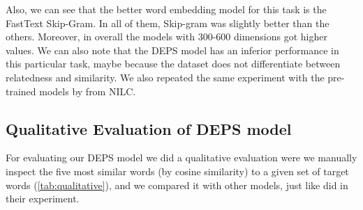 Also, we can see that the better word embedding model for this task is the FastText Skip-Gram. In all of them, Skip-gram was slightly better than the others. Moreover, in overall the models with 300-600 dimensions got higher values. We can also note that the DEPS model has an inferior performance in this particular task, maybe because the dataset does not differentiate between relatedness and similarity.
We also repeated the same experiment with the pre-trained models by  from NILC.


\subsection{Qualitative Evaluation of DEPS model}\label{chap:results:qualitative}

For evaluating our DEPS model we did a qualitative evaluation were we manually inspect the five most similar words (by cosine similarity) to a given set of target words (\autoref{tab:qualitative}), and we compared it with other models, just like  did in their experiment.



